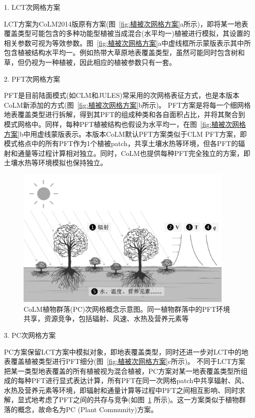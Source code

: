 1. LCT次网格方案

LCT方案为CoLM2014版原有方案(图~\ref{fig:植被次网格方案}a所示)，即将某一地表覆盖类型可能包含的多种功能型植被当成混合(水平均一)植被进行模拟，其设置的相关参数可视为等效参数。图~\ref{fig:植被次网格方案}a中虚线框所示蒙版表示其中所包含植被结构水平均一。例如热带大草原地表覆盖类型，虽然可能同时包含树和草，但仍视为一种植被，因此相应的植被参数只有一套。

2. PFT次网格方案

PFT是目前陆面模式(如CLM和JULES)常采用的次网格表征方式，也是本版本CoLM新添加的方式(图~\ref{fig:植被次网格方案}b所示)。
PFT方案是将每一个细网格地表覆盖类型进行拆解，得到其PFT的组成种类和各自面积占比，并将其聚合到模式网格中。同样，每种PFT植被结构也假设为水平均一，在图~\ref{fig:植被次网格方案}b中用虚线蒙版表示。本版本CoLM默认PFT方案类似于CLM PFT方案，即模式格点中的所有PFT作为1个植被patch，共享土壤水热等环境，但各PFT的辐射和通量等过程计算相对独立。同时，CoLM也提供每种PFT完全独立的方案，即土壤水热等环境模拟也保持独立。

{
  \begin{figure}[htbp]
    \centering
    \includegraphics[width=0.95\textwidth]{Figures/模式构架/植物群落示意图_v2.jpg}
    \caption[CoLM植物群落(PC)次网格概念示意图]{CoLM植物群落(PC)次网格概念示意图。同一植物群落中的PFT环境共享，资源竞争，包括辐射、风速、水热及营养元素等}
    \label{fig:植物群落示意图}
  \end{figure}
}

3. PC次网格方案

PC方案保留LCT方案中模拟对象，即地表覆盖类型，同时还进一步对LCT中的地表覆盖植被类型进行PFT细分(图~\ref{fig:植被次网格方案}c所示)。
不同于LCT方案把某一类型地表覆盖的所有植被视为混合植被，PC方案对某一地表覆盖类型所组成的每种PFT进行显式表达计算，所有PFT在同一次网格patch中共享辐射、风、水热及营养元素等环境，即辐射和通量计算等过程中PFT之间相互影响、同时求解，显式地考虑了PFT之间的共存与竞争(如图~\ref{fig:植物群落示意图} 所示)。这一方案类似于植物群落的概念，故命名为PC (Plant Community)方案。


